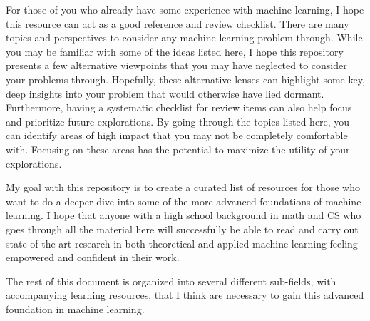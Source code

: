 For those of you who already have some experience with machine learning,
I hope this resource can act as a good reference and review checklist.
There are many topics and perspectives to consider any machine learning
problem through. While you may be familiar with some of the ideas listed
here, I hope this repository presents a few alternative viewpoints that
you may have neglected to consider your problems through. Hopefully,
these alternative lenses can highlight some key, deep insights into your
problem that would otherwise have lied dormant. Furthermore, having a
systematic checklist for review items can also help focus and prioritize
future explorations. By going through the topics listed here, you can
identify areas of high impact that you may not be completely comfortable
with. Focusing on these areas has the potential to maximize the utility
of your explorations.

My goal with this repository is to create a curated list of resources
for those who want to do a deeper dive into some of the more advanced
foundations of machine learning. I hope that anyone with a high school
background in math and CS who goes through all the material here will
successfully be able to read and carry out state-of-the-art research in
both theoretical and applied machine learning feeling empowered and
confident in their work.

The rest of this document is organized into several different
sub-fields, with accompanying learning resources, that I think are
necessary to gain this advanced foundation in machine learning.
